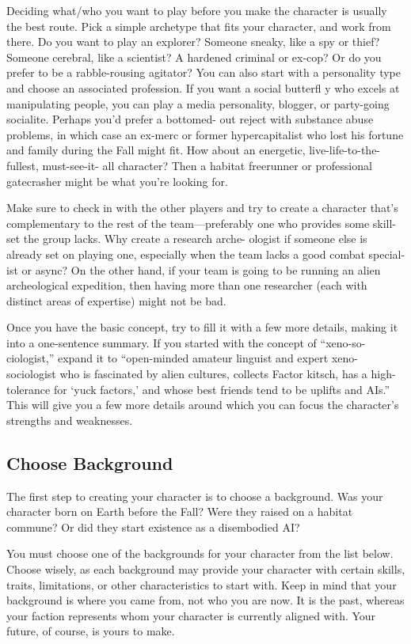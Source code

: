 Deciding what/who you want to play before you make 
the character is usually the best route. Pick a simple 
archetype that fits your character, and work from there. 
Do you want to play an explorer? Someone sneaky, 
like a spy or thief? Someone cerebral, like a scientist? 
A hardened criminal or ex-cop? Or do you prefer to 
be a rabble-rousing agitator? You can also start with a 
personality type and choose an associated profession. If 
you want a social butterfl y who excels at manipulating 
people, you can play a media personality, blogger, or 
party-going socialite. Perhaps you'd prefer a bottomed-
out reject with substance abuse problems, in which 
case an ex-merc or former hypercapitalist who lost 
his fortune and family during the Fall might fit. How 
about an energetic, live-life-to-the-fullest, must-see-it-
all character? Then a habitat freerunner or professional 
gatecrasher might be what you're looking for.

Make sure to check in with the other players and 
try to create a character that's complementary to the 
rest of the team—preferably one who provides some 
skill-set the group lacks. Why create a research arche-
ologist if someone else is already set on playing one, 
especially when the team lacks a good combat special-
ist or async? On the other hand, if your team is going 
to be running an alien archeological expedition, then 
having more than one researcher (each with distinct 
areas of expertise) might not be bad.

Once you have the basic concept, try to fill it with 
a few more details, making it into a one-sentence 
summary. If you started with the concept of ``xeno-so-
ciologist,'' expand it to ``open-minded amateur linguist 
and expert xeno-sociologist who is fascinated by alien 
cultures, collects Factor kitsch, has a high-tolerance 
for ‘yuck factors,' and whose best friends tend to be 
uplifts and AIs.'' This will give you a few more details 
around which you can focus the character's strengths 
and weaknesses.

\subsection{Choose Background}

The first step to creating your character is to choose a 
background. Was your character born on Earth before 
the Fall? Were they raised on a habitat commune? Or 
did they start existence as a disembodied AI?

You must choose one of the backgrounds for your 
character from the list below. Choose wisely, as each 
background may provide your character with certain 
skills, traits, limitations, or other characteristics to 
start with. Keep in mind that your background is 
where you came from, not who you are now. It is 
the past, whereas your faction represents whom your 
character is currently aligned with. Your future, of 
course, is yours to make.

